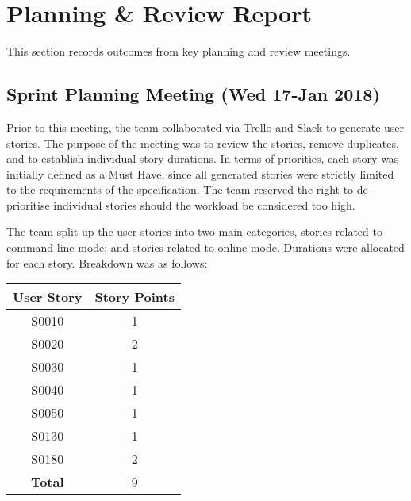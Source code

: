 \newpage
\section{Planning \& Review Report}

This section records outcomes from key planning and review meetings.

\subsection{Sprint Planning Meeting (Wed 17-Jan 2018)}

Prior to this meeting, the team collaborated via Trello and Slack to generate user stories.
The purpose of the meeting was to review the stories, remove duplicates, and to establish individual story durations.
In terms of priorities, each story was initially defined as a Must Have, since all generated stories were strictly limited to the requirements of the specification.
The team reserved the right to de-prioritise individual stories should the workload be considered too high.

The team split up the user stories into two main categories, stories related to command line mode; and stories related to online mode.
Durations were allocated for each story. Breakdown was as follows:


\begin{center}
	\begin{tabular}{*{2}c}
		\hline
		\textbf{User Story} & \textbf{Story Points} \\
		\hline
		S0010 & 1 \\
		S0020 & 2 \\
		S0030 & 1 \\
		S0040 & 1 \\
		S0050 & 1 \\
		S0130 & 1 \\
		S0180 & 2 \\
		\hline
		\textbf{Total} & 9 \\
		\hline
	\end{tabular}
	\label{table:planning_command_line_stories}
\end{center}

